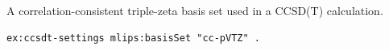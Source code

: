 A correlation-consistent triple-zeta basis set used in a CCSD(T) calculation.
\begin{lstlisting}[language=turtle]
ex:ccsdt-settings mlips:basisSet "cc-pVTZ" .
\end{lstlisting}
